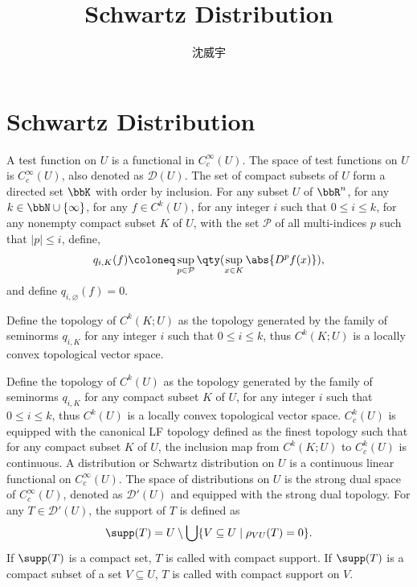 \documentclass[a4paper,12pt]{report}
\begin{document}
\title{Schwartz Distribution}
\author{沈威宇}
\date{\temtoday}
\titletocdoc
\section{Schwartz Distribution}
A test function on $U$ is a functional in $C^{\infty}_c(U)$. The space of test functions on $U$ is $C^{\infty}_c(U)$, also denoted as $\mathcal{D}(U)$.
The set of compact subsets of $U$ form a directed set $\bbK$ with order by inclusion.
For any subset $U$ of $\bbR^n$, for any $k\in\bbN\cup\{\infty\}$, for any $f\in C^k(U)$, for any integer $i$ such that $0\leq i\leq k$, for any nonempty compact subset $K$ of $U$, with the set $\mathcal{P}$ of all multi-indices $p$ such that $|p|\leq i$, define,
\[q_{i,K}(f)\coloneq\sup_{p\in\mathcal{P}}\qty(\sup_{x\in K}\abs{D^pf(x)}),\]
and define $q_{i,\varnothing}(f)=0$.

Define the topology of $C^k(K;U)$ as the topology generated by the family of seminorms $q_{i,K}$ for any integer $i$ such that $0\leq i\leq k$, thus $C^k(K;U)$ is a locally convex topological vector space.

Define the topology of $C^k(U)$ as the topology generated by the family of seminorms $q_{i,K}$ for any compact subset $K$ of $U$, for any integer $i$ such that $0\leq i\leq k$, thus $C^k(U)$ is a locally convex topological vector space.
$C^k_c(U)$ is equipped with the canonical LF topology defined as the finest topology such that for any compact subset $K$ of $U$, the inclusion map from $C^k(K;U)$ to $C^k_c(U)$ is continuous.
A distribution or Schwartz distribution on $U$ is a continuous linear functional on $C^{\infty}_c(U)$. The space of distributions on $U$ is the strong dual space of $C^{\infty}_c(U)$, denoted as $\mathcal{D}'(U)$ and equipped with the strong dual topology.
For any $T\in\mathcal{D}'(U)$, the support of $T$ is defined as
\[\supp(T)=U\setminus\bigcup\{V\subseteq U\mid\rho_{VU}(T)=0\}.\]
If $\supp(T)$ is a compact set, $T$ is called with compact support. If $\supp(T)$ is a compact subset of a set $V\subseteq U$, $T$ is called with compact support on $V$.
\end{document}
